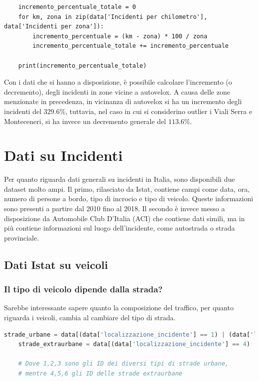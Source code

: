 \documentclass[a4paper]{report}
\begin{document}
\begin{lstlisting}
    incremento_percentuale_totale = 0
    for km, zona in zip(data['Incidenti per chilometro'], data['Incidenti per zona']): 
        incremento_percentuale = (km - zona) * 100 / zona
        incremento_percentuale_totale += incremento_percentuale

    print(incremento_percentuale_totale)
\end{lstlisting}

Con i dati che si hanno a disposizione, è possibile calcolare l'incremento (o decremento), degli 
incidenti in zone vicine a autovelox.
A causa delle zone menzionate in precedenza, in vicinanza di autovelox si ha un incremento degli 
incidenti del $329.6$\%, tuttavia, nel caso in cui si considerino outlier i Viali Serra e Monteceneri, 
si ha invece un decremento generale del $113.6$\%.


\chapter{Dati su Incidenti}

Per quanto riguarda dati generali su incidenti in Italia, sono disponibili due dataset molto ampi. 
Il primo, rilasciato da Istat, contiene campi come data, ora, 
numero di persone a bordo, tipo di incrocio e tipo di veicolo.
Queste informazioni sono presenti a partire dal 2010 fino al 2018.
Il secondo è invece messo a disposizione da Automobile Club D'Italia (ACI) che contiene dati simili, 
ma in più contiene informazioni sul luogo dell'incidente, come autostrada o strada provinciale.

\section{Dati Istat su veicoli}

\subsection{Il tipo di veicolo dipende dalla strada?}

Sarebbe interessante sapere quanto la composizione del traffico, per quanto riguarda i veicoli, 
cambia al cambiare del tipo di strada.

\begin{lstlisting}[language=Python]
    strade_urbane = data[(data['localizzazione_incidente'] == 1) | (data['localizzazione_incidente'] == 2) | (data['localizzazione_incidente'] == 3)]['tipo_veicolo_a']
    strade_extraurbane = data[(data['localizzazione_incidente'] == 4) | (data['localizzazione_incidente'] == 5) | (data['localizzazione_incidente'] == 6)]['tipo_veicolo_a']

    # Dove 1,2,3 sono gli ID dei diversi tipi di strade urbane, 
    # mentre 4,5,6 gli ID delle strade extraurbane
\end{lstlisting}
\end{document}
